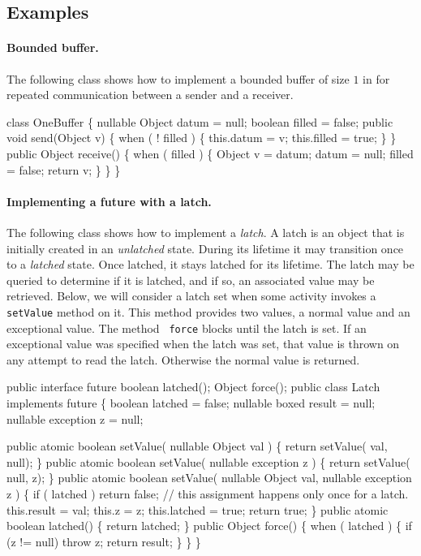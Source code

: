 {{\subsection{Examples}

\paragraph{Bounded buffer.}
The following class shows how to implement a bounded buffer of size
$1$ in \Xten{} for repeated communication between a sender and a
receiver.

\begin{x10}
class OneBuffer \{
  nullable Object datum = null;
  boolean filled = false;
  public 
     void send(Object v) \{
     when ( ! filled ) \{
       this.datum = v;
       this.filled = true;
    \}
 \}
  public
    Object receive() \{
      when ( filled ) \{
        Object v  = datum;
        datum = null;
        filled = false;
        return v;
      \}
  \}
\}
\end{x10}

\paragraph{ Implementing a future with a latch.}\label{future-imp}
The following class shows how to implement a {\em latch}. A latch is
an object that is initially created in an {\em unlatched}
state. During its lifetime it may transition once to a {\em latched}
state. Once latched, it stays latched for its lifetime. The latch may
be queried to determine if it is latched, and if so, an associated
value may be retrieved. Below, we will consider a latch set when some
activity invokes a {\tt setValue} method on it. This method provides
two values, a normal value and an exceptional value. The method {\tt
force} blocks until the latch is set. If an exceptional value was
specified when the latch was set, that value is thrown on any attempt
to read the latch. Otherwise the normal value is returned.

\begin{x10}
public interface future {
   boolean latched();
   Object force();
}
public class Latch implements future \{
    boolean latched = false;
    nullable boxed result = null;
    nullable exception z = null;

    public atomic boolean setValue( nullable Object val ) \{
	return setValue( val, null);
    \}
    public atomic boolean setValue( nullable exception z ) \{
	return setValue( null, z);
    \}
    public atomic boolean setValue( nullable Object val, 
                                    nullable exception z ) \{
	if ( latched ) return false;
        // this assignment happens only once for a latch.
	this.result = val;
        this.z = z;
        this.latched = true;
	return true;
    \}
    public atomic boolean latched() \{
	return latched;
    \}
    public Object force() \{
	when ( latched ) \{
            if (z != null) throw z;
	    return result;
	\}
    \}
\}
\end{x10}

}}
